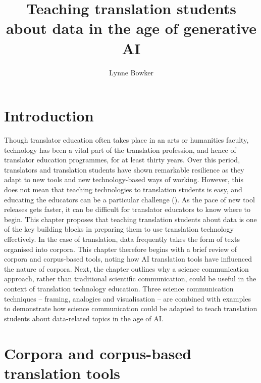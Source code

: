 \documentclass[output=paper]{langscibook}
\author{Lynne Bowker\orcid{}\affiliation{Université Laval, Canada }}
\title{Teaching translation students about data in the age of generative AI}
\begin{document}
\maketitle



\section{Introduction}\label{sec:4:1}
Though translator education often takes place in an arts or humanities faculty, technology has been a vital part of the translation profession, and hence of translator education programmes, for at least thirty years. Over this period, translators and translation students have shown remarkable resilience as they adapt to new tools and new technology-based ways of working. However, this does not mean that teaching technologies to translation students is easy, and educating the educators can be a particular challenge (\citealt{bowker2023, kenny2020}). As the pace of new tool releases gets faster, it can be difficult for translator educators to know where to begin. This chapter proposes that teaching translation students about data is one of the key building blocks in preparing them to use translation technology effectively. In the case of translation, data frequently takes the form of texts organised into corpora. This chapter therefore begins with a brief review of corpora and corpus-based tools, noting how AI translation tools have influenced the nature of corpora. Next, the chapter outlines why a science communication approach, rather than traditional scientific communication, could be useful in the context of translation technology education. Three science communication techniques – framing, analogies and visualisation – are combined with examples to demonstrate how science communication could be adapted to teach translation students about data-related topics in the age of AI.

\section{Corpora and corpus-based translation tools}\label{sec:4:2}
\end{document}
